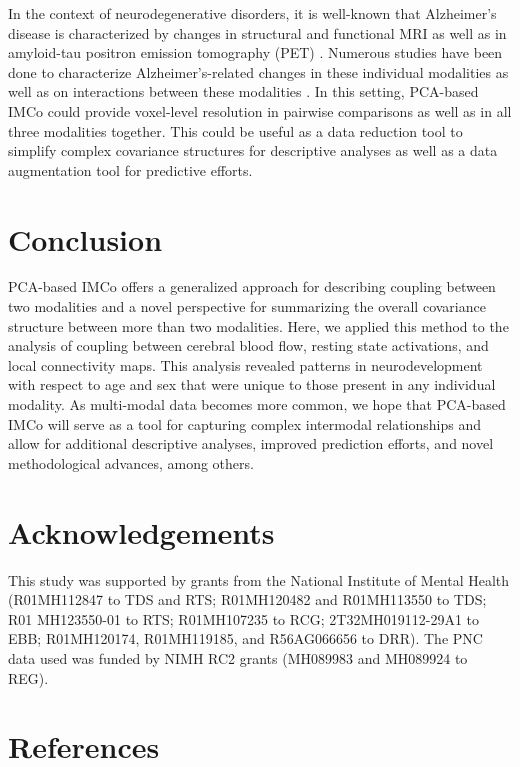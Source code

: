 \documentclass[
  12pt,
]{article}
\newlength{\cslhangindent}
\newlength{\cslentryspacingunit} %
\newenvironment{CSLReferences}[2] %
 {%
  \setlength{\parindent}{0pt}
  \ifodd #1
  \let\oldpar\par
  \def\par{\hangindent=\cslhangindent\oldpar}
  \fi
  \setlength{\parskip}{#2\cslentryspacingunit}
 }%
 {}
\begin{document}
In the context of neurodegenerative disorders, it is well-known that Alzheimer's disease is characterized by changes in structural and functional MRI as well as in amyloid-tau positron emission tomography (PET) \citep{frisoniClinicalUseStructural2010, rowleyAmyloidTauPET2020, sperlingPotentialFunctionalMRI2011}. Numerous studies have been done to characterize Alzheimer's-related changes in these individual modalities as well as on interactions between these modalities \citep{bucknerMolecularStructuralFunctional2005, hasaniSystematicReviewAssociation2021, renApplicationStructuralFunctional2020, walesEffectsAmyloidTau2021}. In this setting, PCA-based IMCo could provide voxel-level resolution in pairwise comparisons as well as in all three modalities together. This could be useful as a data reduction tool to simplify complex covariance structures for descriptive analyses as well as a data augmentation tool for predictive efforts.

\hypertarget{conclusion}{%
\section{Conclusion}\label{conclusion}}

PCA-based IMCo offers a generalized approach for describing coupling between two modalities and a novel perspective for summarizing the overall covariance structure between more than two modalities. Here, we applied this method to the analysis of coupling between cerebral blood flow, resting state activations, and local connectivity maps. This analysis revealed patterns in neurodevelopment with respect to age and sex that were unique to those present in any individual modality. As multi-modal data becomes more common, we hope that PCA-based IMCo will serve as a tool for capturing complex intermodal relationships and allow for additional descriptive analyses, improved prediction efforts, and novel methodological advances, among others.

\hypertarget{acknowledgements}{%
\section{Acknowledgements}\label{acknowledgements}}

This study was supported by grants from the National Institute of Mental Health (R01MH112847 to TDS and RTS; R01MH120482 and R01MH113550 to TDS; R01 MH123550-01 to RTS; R01MH107235 to RCG; 2T32MH019112-29A1 to EBB; R01MH120174, R01MH119185, and R56AG066656 to DRR). The PNC data used was funded by NIMH RC2 grants (MH089983 and MH089924 to REG).

\hypertarget{references}{%
\section{References}\label{references}}

\hypertarget{refs}{}
\begin{CSLReferences}{0}{0}
\end{CSLReferences}

\hypertarget{appendix-supplementary-materials}{%
\appendix}


  
\end{document}
